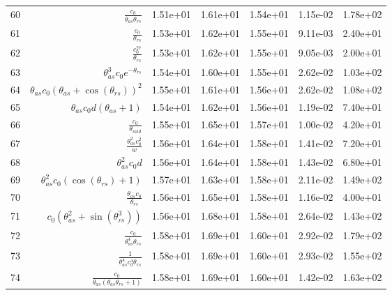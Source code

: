 \begin{tabularx}{\textwidth}{lRRRRRl}
60  &  $ \displaystyle\frac{c_{0}}{\theta_{as} \theta_{rs}} $  &  1.51e+01  &  1.61e+01  &  1.54e+01  &  1.15e-02  &  1.78e+02  \\ 
61  &  $ \displaystyle\frac{c_{0}}{\theta_{rs}} $  &  1.53e+01  &  1.62e+01  &  1.55e+01  &  9.11e-03  &  2.40e+01  \\ 
62  &  $ \displaystyle\frac{c_{0}^{27}}{\theta_{rs}} $  &  1.53e+01  &  1.62e+01  &  1.55e+01  &  9.05e-03  &  2.00e+01  \\ 
63  &  $ \theta_{as}^{3} c_{0} e^{- \theta_{rs}} $  &  1.54e+01  &  1.60e+01  &  1.55e+01  &  2.62e-02  &  1.03e+02  \\ 
64  &  $ \theta_{as} c_{0} \left(\theta_{as} + \cos{\left(\theta_{rs} \right)}\right)^{2} $  &  1.55e+01  &  1.61e+01  &  1.56e+01  &  2.62e-02  &  1.08e+02  \\ 
65  &  $ \theta_{as} c_{0} d \left(\theta_{as} + 1\right) $  &  1.54e+01  &  1.62e+01  &  1.56e+01  &  1.19e-02  &  7.40e+01  \\ 
66  &  $ \displaystyle\frac{c_{0}}{\theta_{mid}} $  &  1.55e+01  &  1.65e+01  &  1.57e+01  &  1.00e-02  &  4.20e+01  \\ 
67  &  $ \displaystyle\frac{\theta_{as}^{2} c_{0}^{2}}{w} $  &  1.56e+01  &  1.64e+01  &  1.58e+01  &  1.41e-02  &  7.20e+01  \\ 
68  &  $ \theta_{as}^{2} c_{0} d $  &  1.56e+01  &  1.64e+01  &  1.58e+01  &  1.43e-02  &  6.80e+01  \\ 
69  &  $ \theta_{as}^{2} c_{0} \left(\cos{\left(\theta_{rs} \right)} + 1\right) $  &  1.57e+01  &  1.63e+01  &  1.58e+01  &  2.11e-02  &  1.49e+02  \\ 
70  &  $ \displaystyle\frac{\theta_{as} c_{0}}{\theta_{rs}} $  &  1.56e+01  &  1.65e+01  &  1.58e+01  &  1.16e-02  &  4.00e+01  \\ 
71  &  $ c_{0} \left(\theta_{as}^{2} + \sin{\left(\theta_{rs}^{3} \right)}\right) $  &  1.56e+01  &  1.68e+01  &  1.58e+01  &  2.64e-02  &  1.43e+02  \\ 
72  &  $ \displaystyle\frac{c_{0}}{\theta_{as}^{4} \theta_{rs}} $  &  1.58e+01  &  1.69e+01  &  1.60e+01  &  2.92e-02  &  1.79e+02  \\ 
73  &  $ \displaystyle\frac{1}{\theta_{as}^{4} c_{0}^{4} \theta_{rs}} $  &  1.58e+01  &  1.69e+01  &  1.60e+01  &  2.93e-02  &  1.55e+02  \\ 
74  &  $ \displaystyle\frac{c_{0}}{\theta_{as} \left(\theta_{as} \theta_{rs} + 1\right)} $  &  1.58e+01  &  1.69e+01  &  1.60e+01  &  1.42e-02  &  1.63e+02  \\ 

\end{tabularx}
